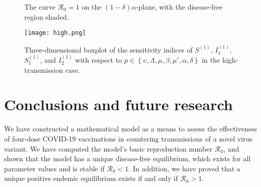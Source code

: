 \documentclass[11pt,reqno]{amsart}
\newcommand{\cR}{\mathcal{R}}
\begin{document}
\begin{figure}\centering
{}
\caption{\label{fig:R0=1extreme}The curve $\cR_0=1$ on the $(1-\delta)\alpha$-plane, with the disease-free region shaded.}
\end{figure}

\begin{figure}\centering
	\texttt{[image: high.png]}
	\caption{\label{fig:sensitivityhigh}Three-dimensional boxplot of the sensitivity indices of $S^{(1)}$, $I_1^{(1)}$, $S_1^{(1)}$, and $I_2^{(1)}$ with respect to $p\in\left\{\upsilon,\Lambda,\mu,\beta,\mu',\alpha,\delta\right\}$ in the high-transmission case.}
\end{figure}

\section{Conclusions and future research}\label{sec:conclusions}

We have constructed a mathematical model as a means to assess the effectiveness of four-dose COVID-19 vaccinations in countering transmissions of a novel virus variant. We have computed the model's basic reproduction number $\mathcal{R}_0$, and shown that the model has a unique disease-free equilibrium, which exists for all parameter values and is stable if $\cR_0<1$. In addition, we have proved that a unique positive endemic equilibrium exists if and only if $\mathcal{R}_0>1$.
\end{document}
